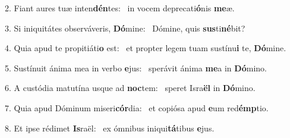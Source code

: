 2. Fiant aures tuæ inten\textbf{dén}tes: \ast\  in vocem deprecati\textbf{ó}nis \textbf{me}æ.\

3. Si iniquitátes observáveris, \textbf{Dó}mine: \ast\  Dómine, quis \textbf{sus}ti\textbf{né}bit?\

4. Quia apud te propitiáti\textbf{o} est: \ast\  et propter legem tuam sustínu\textbf{i} te, \textbf{Dó}mine.\

5. Sustínuit ánima mea in verbo \textbf{e}jus: \ast\  sperávit ánima \textbf{me}a in \textbf{Dó}mino.\

6. A custódia matutína usque ad \textbf{noc}tem: \ast\  speret Isra\textbf{ël} in \textbf{Dó}mino.\

7. Quia apud Dóminum miseri\textbf{cór}dia: \ast\  et copiósa apud \textbf{e}um red\textbf{émp}tio.\

8. Et ipse rédimet \textbf{Is}raël: \ast\  ex ómnibus iniqui\textbf{tá}tibus \textbf{e}jus.\

